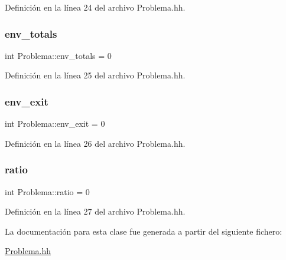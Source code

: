 Definición en la línea 24 del archivo Problema.\+hh.

\mbox{\label{class_problema_a1ae31ed3447f421290a6457829c5eeaf}} 
\subsubsection{\texorpdfstring{env\+\_\+totals}{env\_totals}}
{\footnotesize\ttfamily int Problema\+::env\+\_\+totals = 0}



Definición en la línea 25 del archivo Problema.\+hh.

\mbox{\label{class_problema_a5b2c8a0e235116aca6923ff06b9a2496}} 
\subsubsection{\texorpdfstring{env\+\_\+exit}{env\_exit}}
{\footnotesize\ttfamily int Problema\+::env\+\_\+exit = 0}



Definición en la línea 26 del archivo Problema.\+hh.

\mbox{\label{class_problema_a60b1cdada4c343e31d041389f8005518}} 
\subsubsection{\texorpdfstring{ratio}{ratio}}
{\footnotesize\ttfamily int Problema\+::ratio = 0}



Definición en la línea 27 del archivo Problema.\+hh.



La documentación para esta clase fue generada a partir del siguiente fichero\+:\begin{DoxyCompactItemize}
\item 
\mbox{\hyperlink{_problema_8hh}{Problema.\+hh}}\end{DoxyCompactItemize}
